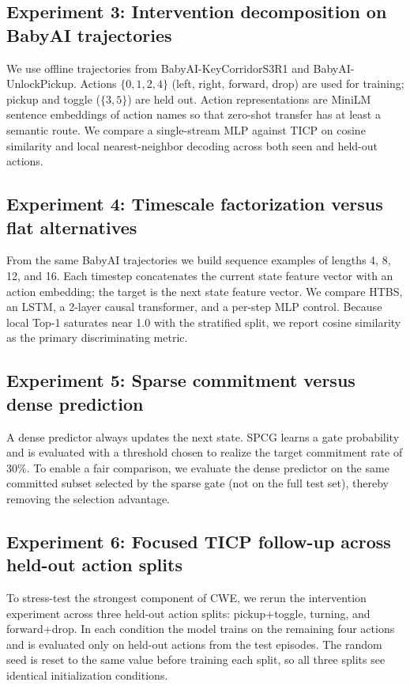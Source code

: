 \documentclass[11pt]{article}
\begin{document}
\subsection{Experiment 3: Intervention decomposition on BabyAI trajectories}
We use offline trajectories from BabyAI-KeyCorridorS3R1 and BabyAI-UnlockPickup. Actions $\{0,1,2,4\}$ (left, right, forward, drop) are used for training; pickup and toggle ($\{3,5\}$) are held out. Action representations are MiniLM sentence embeddings of action names so that zero-shot transfer has at least a semantic route. We compare a single-stream MLP against TICP on cosine similarity and local nearest-neighbor decoding across both seen and held-out actions.

\subsection{Experiment 4: Timescale factorization versus flat alternatives}
From the same BabyAI trajectories we build sequence examples of lengths 4, 8, 12, and 16. Each timestep concatenates the current state feature vector with an action embedding; the target is the next state feature vector. We compare HTBS, an LSTM, a 2-layer causal transformer, and a per-step MLP control. Because local Top-1 saturates near 1.0 with the stratified split, we report cosine similarity as the primary discriminating metric.

\subsection{Experiment 5: Sparse commitment versus dense prediction}
A dense predictor always updates the next state. SPCG learns a gate probability and is evaluated with a threshold chosen to realize the target commitment rate of 30\%. To enable a fair comparison, we evaluate the dense predictor on the same committed subset selected by the sparse gate (not on the full test set), thereby removing the selection advantage.

\subsection{Experiment 6: Focused TICP follow-up across held-out action splits}
To stress-test the strongest component of CWE, we rerun the intervention experiment across three held-out action splits: pickup+toggle, turning, and forward+drop. In each condition the model trains on the remaining four actions and is evaluated only on held-out actions from the test episodes. The random seed is reset to the same value before training each split, so all three splits see identical initialization conditions.
\end{document}
